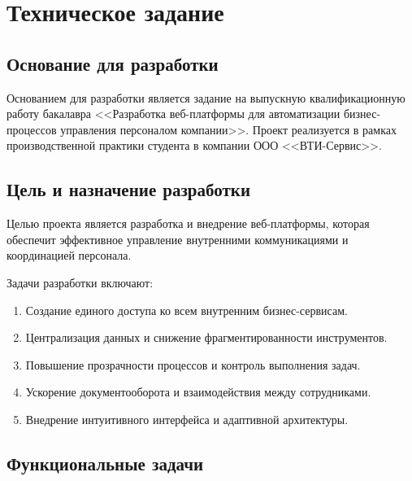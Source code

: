 \section{Техническое задание}

\subsection{Основание для разработки}

Основанием для разработки является задание на выпускную квалификационную работу бакалавра <<Разработка веб-платформы для автоматизации бизнес-процессов управления персоналом компании>>. Проект реализуется в рамках производственной практики студента в компании ООО <<ВТИ-Сервис>>.

\subsection{Цель и назначение разработки}

Целью проекта является разработка и внедрение веб-платформы, которая обеспечит эффективное управление внутренними коммуникациями и координацией персонала.

Задачи разработки включают:

\begin{enumerate}
  \item Создание единого доступа ко всем внутренним бизнес-сервисам.
  \item Централизация данных и снижение фрагментированности инструментов.
  \item Повышение прозрачности процессов и контроль выполнения задач.
  \item Ускорение документооборота и взаимодействия между сотрудниками.
  \item Внедрение интуитивного интерфейса и адаптивной архитектуры.
\end{enumerate}

\subsection{Функциональные задачи}


